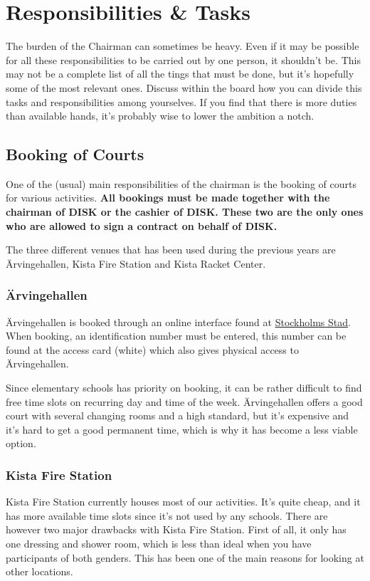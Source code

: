 \documentclass[12pt,a4paper]{article}
\begin{document}
	\section{Responsibilities \& Tasks}
		The burden of the Chairman can sometimes be heavy. Even if it may be possible for all these responsibilities to be carried out by one person, it shouldn't be. This may not be a complete list of all the tings that must be done, but it's hopefully some of the most relevant ones. Discuss within the board how you can divide this tasks and responsibilities among yourselves. If you find that there is more duties than available hands, it's probably wise to lower the ambition a notch.

		\subsection{Booking of Courts}
			One of the (usual) main responsibilities of the chairman is the booking of courts for various activities. \textbf{All bookings must be made together with the chairman of DISK or the cashier of DISK. These two are the only ones who are allowed to sign a contract on behalf of DISK.}

			The three different venues that has been used during the previous years are Ärvingehallen, Kista Fire Station and Kista Racket Center.
			\subsubsection{Ärvingehallen}
			Ärvingehallen is booked through an online interface found at \href{http://booking.stockholm.se/}{Stockholms Stad}. When booking, an identification number must be entered, this number can be found at the access card (white) which also gives physical access to Ärvingehallen.

			Since elementary schools has priority on booking, it can be rather difficult to find free time slots on recurring day and time of the week. Ärvingehallen offers a good court with several changing rooms and a high standard, but it's expensive and  it's hard to get a good permanent time, which is why it has become a less viable option.
			\subsubsection{Kista Fire Station}
			Kista Fire Station currently houses most of our activities. It's quite cheap, and it has more available time slots since it's not used by any schools. There are however two major drawbacks with Kista Fire Station. First of all, it only has one dressing and shower room, which is less than ideal when you have participants of both genders. This has been one of the main reasons for looking at other locations.
\end{document}
